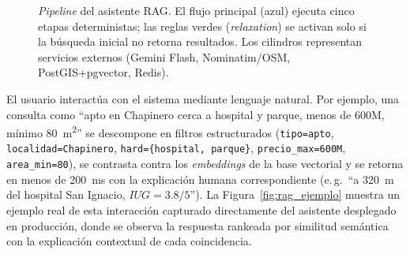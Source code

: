 \documentclass[12pt, a4paper, twoside, openright]{report}
\theoremstyle{plain}
\theoremstyle{definition}
\newcommand{\IUG}{IUG}             %
\begin{document}
\begin{figure}[htbp]
{}
\caption{\emph{Pipeline} del asistente RAG. El flujo principal (azul) ejecuta cinco etapas deterministas; las reglas verdes (\emph{relaxation}) se activan solo si la búsqueda inicial no retorna resultados. Los cilindros representan servicios externos (Gemini Flash, Nominatim/OSM, PostGIS+pgvector, Redis).}
\label{fig:pipeline_rag}
\end{figure}

El usuario interactúa con el sistema mediante lenguaje natural. Por ejemplo, una consulta como ``apto en Chapinero cerca a hospital y parque, menos de 600M, mínimo 80~m\textsuperscript{2}'' se descompone en filtros estructurados (\texttt{tipo=apto}, \texttt{localidad=Chapinero}, \texttt{hard=\{hospital,~parque\}}, \texttt{precio\_max=600M}, \texttt{area\_min=80}), se contrasta contra los \emph{embeddings} de la base vectorial y se retorna en menos de 200~ms con la explicación humana correspondiente (e.\,g.\ ``a 320~m del hospital San Ignacio, $\IUG = 3.8/5$''). La Figura~\ref{fig:rag_ejemplo} muestra un ejemplo real de esta interacción capturado directamente del asistente desplegado en producción, donde se observa la respuesta rankeada por similitud semántica con la explicación contextual de cada coincidencia.
\end{document}
